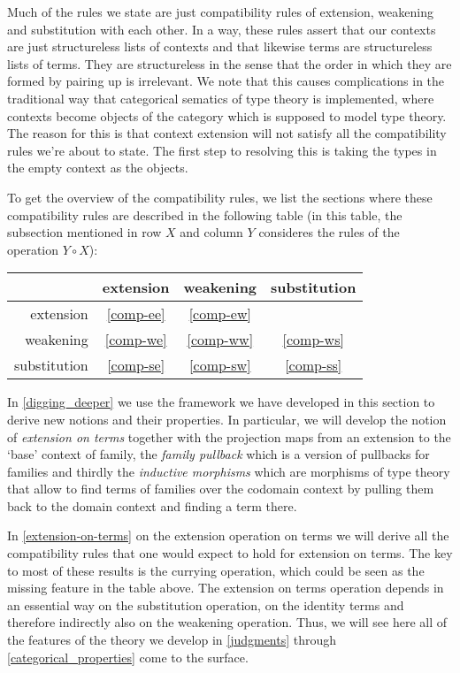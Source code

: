 Much of the rules we state are just compatibility rules of extension, weakening
and substitution with each other. In a way, these rules assert that our contexts
are just structureless lists of contexts and that likewise terms are structureless
lists of terms. They are structureless in the sense that the order in which
they are formed by pairing up is irrelevant. We note that this causes complications
in the traditional way that categorical sematics of type theory is implemented,
where contexts become objects of the category which is supposed to model type
theory. The reason for this is that context extension will not satisfy all the
compatibility rules we're about to state. The first step to resolving this is taking
the types in the empty context as the objects. 

To get the overview of the compatibility rules, we list the sections
where these compatibility rules are described in the following table (in this
table, the
subsection mentioned in row $X$ and column $Y$ consideres the rules of the
operation $Y\circ X$):
\begin{center}
\begin{tabular}{r|ccc}
& extension & weakening & substitution\\
\hline
extension & \autoref{comp-ee} & \autoref{comp-ew} & \\
weakening & \autoref{comp-we} & \autoref{comp-ww} & \autoref{comp-ws}\\
substitution & \autoref{comp-se} & \autoref{comp-sw} & \autoref{comp-ss}
\end{tabular}
\end{center}

In \autoref{digging_deeper} we use the framework we have developed in this
section to derive new notions and their properties. In particular, we will
develop the notion of \emph{extension on terms} together with the projection
maps from an extension to the `base' context of family, the 
\emph{family pullback} which is a version of pullbacks for families and thirdly
the \emph{inductive morphisms} which are morphisms of type theory that allow
to find terms of families over the codomain context by pulling them back to
the domain context and finding a term there.

In \autoref{extension-on-terms} on the extension operation on terms we will
derive all the compatibility rules that one would expect to hold for extension
on terms. The key to most of these results is the currying operation, which
could be seen as the missing feature in the table above. The extension on terms
operation depends in an essential way on the substitution operation, on the
identity terms and therefore indirectly also on the weakening operation. Thus,
we will see here all of the features of the theory we develop in
\autoref{judgments} through \autoref{categorical_properties} come to the 
surface.

